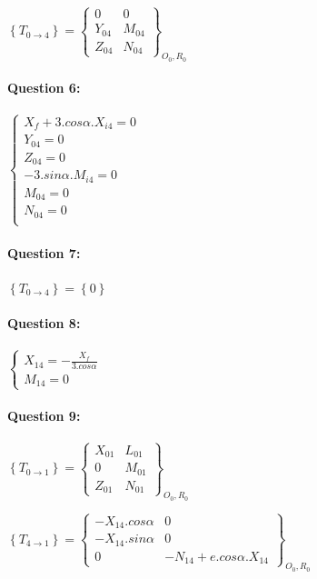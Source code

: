$\left\{T_{0\rightarrow 4}\right\}=\left\{\begin{array}{cc}
0 & 0 \\ Y_{04} & M_{04} \\ Z_{04} & N_{04}
\end{array}\right\}_{O_0,R_0}$

\paragraph{Question 6:}

$\left\{\begin{array}{l}
X_f+3.cos\alpha.X_{i4}=0 \\
Y_{04}=0 \\
Z_{04}=0 \\
-3.sin\alpha.M_{i4}=0 \\
M_{04}=0 \\
N_{04}=0 \\
\end{array}\right.$

\paragraph{Question 7:}

$\left\{T_{0\rightarrow 4}\right\}=\left\{0\right\}$

\paragraph{Question 8:}

$\left\{\begin{array}{l}
X_{14}=-\frac{X_f}{3.cos\alpha} \\
M_{14}=0
\end{array}\right.$

\paragraph{Question 9:}

$\left\{T_{0\rightarrow 1}\right\}=\left\{\begin{array}{cc}
X_{01} & L_{01} \\ 0 & M_{01} \\ Z_{01} & N_{01}
\end{array}\right\}_{O_0,R_0}$

$\left\{T_{4\rightarrow 1}\right\}=\left\{\begin{array}{cc}
-X_{14}.cos\alpha & 0 \\ -X_{14}.sin\alpha & 0 \\ 0 & -N_{14}+e.cos\alpha.X_{14}
\end{array}\right\}_{O_0,R_0}$

